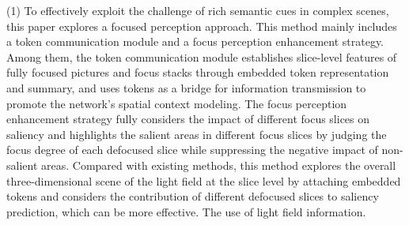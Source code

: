 \begin{englishabstract}
(1)
%
%
To effectively exploit the challenge of rich semantic cues in complex scenes, this paper explores a focused perception approach. This method mainly includes a token communication module and a focus perception enhancement strategy. Among them, the token communication module establishes slice-level features of fully focused pictures and focus stacks through embedded token representation and summary, and uses tokens as a bridge for information transmission to promote the network's spatial context modeling. The focus perception enhancement strategy fully considers the impact of different focus slices on saliency and highlights the salient areas in different focus slices by judging the focus degree of each defocused slice while suppressing the negative impact of non-salient areas. Compared with existing methods, this method explores the overall three-dimensional scene of the light field at the slice level by attaching embedded tokens and considers the contribution of different defocused slices to saliency prediction, which can be more effective. The use of light field information.





\end{englishabstract}
